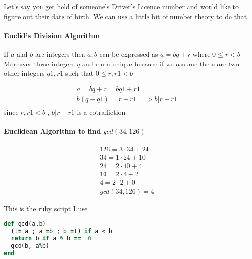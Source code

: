 \documentclass[12pt]{article}
\begin{document}
\maketitle


Let's say you get hold of someone's Driver's Licence number and would like to figure out their date of birth. We can use a little bit of number theory to do that.

\paragraph{Euclid's Division Algorithm}
If $a$ and $b$ are integers then $a,b$ can be expressed as $a = bq + r$  where $ 0 \leq  r < b$
Moreover these integers $q$ and $r$ are unique because if we assume there are two other integers $q1,r1$ 
such that   $ 0 \leq  r, r1 < b$ 


  \begin{align}
 a = bq + r = bq1 + r1 \\
 b(q-q1) = r -r1  => b | r -r1 \\
  \end{align}
 since $r,r1 < b$ , $b|r-r1$ is a cotradiction

\paragraph{Euclidean Algorithm to find $gcd(34,126)$ }
  \begin{align}
    126 = 3 \cdot 34 + 24 \\
    34 = 1 \cdot 24 + 10 \\
    24 = 2 \cdot 10 + 4 \\
    10 = 2 \cdot 4 + 2 \\
    4 = 2 \cdot 2 + 0\\
    gcd(34,126) = 4
  \end{align}

This is the ruby script I use 
\begin{lstlisting}[language=Ruby]
def gcd(a,b)
  (t= a ; a =b ; b =t) if a < b 
  return b if a % b ==  0 
  gcd(b, a%b) 
end
\end{lstlisting}
\end{document}
